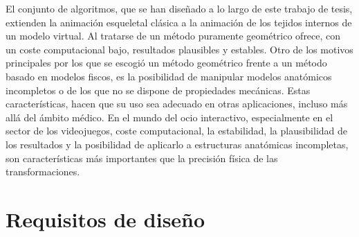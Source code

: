 El conjunto de algoritmos, que se han diseñado a lo largo de este trabajo de tesis, extienden la animación esqueletal clásica a la animación de los tejidos internos de un modelo virtual. Al tratarse de un método puramente geométrico ofrece, con un coste computacional bajo, resultados plausibles y estables. Otro de los motivos principales por los que se escogió un método geométrico frente a un método basado en modelos fiscos, es la posibilidad de manipular modelos anatómicos incompletos o de los que no se dispone de propiedades mecánicas. Estas características, hacen que su uso sea adecuado en otras aplicaciones, incluso más allá del ámbito médico.  En el mundo del ocio interactivo, especialmente en el sector de los videojuegos, coste computacional, la estabilidad, la plausibilidad de los resultados y la posibilidad de aplicarlo a estructuras anatómicas incompletas, son características más importantes que la precisión física de las transformaciones. 


\section{Requisitos de diseño}

\label{posing:req}



